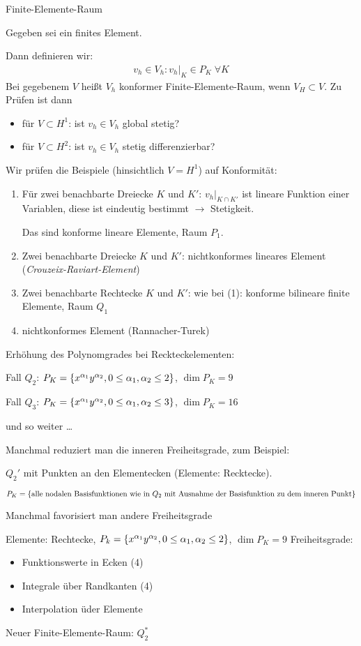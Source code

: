 \begin{definition} Finite-Elemente-Raum

Gegeben sei ein finites Element.

Dann definieren wir:
\begin{align*}
 v_h \in V_h: v_h|_K \in P_K \; \forall K
\end{align*}
Bei gegebenem $V$ heißt $V_h$ konformer Finite-Elemente-Raum, wenn $V_H \subset V$. Zu Prüfen ist dann
\begin{itemize}
\item für $V \subset H^1$: ist $v_h \in V_h$ global stetig?
\item für $V \subset H^2$: ist $v_h \in V_h$ stetig differenzierbar?
\end{itemize}
\end{definition}

Wir prüfen die Beispiele (hinsichtlich $V = H^1$) auf Konformität:
\begin{enumerate}
\item Für zwei benachbarte Dreiecke $K$ und $K'$: $v_h|_{K \cap K'}$ ist lineare Funktion einer Variablen, diese ist eindeutig bestimmt $\to$ Stetigkeit.

Das sind konforme lineare Elemente, Raum \emph{$P_1$}.
\item Zwei benachbarte Dreiecke $K$ und $K'$: nichtkonformes lineares Element (\emph{Crouzeix-Raviart-Element})
\item Zwei benachbarte Rechtecke $K$ und $K'$: wie bei (1): konforme bilineare finite Elemente, Raum \emph{$Q_1$}
\setcounter{enumi}{4}
\item nichtkonformes Element (Rannacher-Turek)
\end{enumerate}

Erhöhung des Polynomgrades bei Reckteckelementen:

Fall $Q_2$: $P_K = \left\{ x^{\alpha_1}y^{\alpha_2}, 0 \leq \alpha_1, \alpha_2 \leq 2 \right\}$, $\dim P_K = 9$

Fall $Q_3$: $P_K = \left\{ x^{\alpha_1}y^{\alpha_2}, 0 \leq \alpha_1, \alpha_2 \leq 3 \right\}$, $\dim P_K = 16$

und so weiter \dots

Manchmal reduziert man die inneren Freiheitsgrade, zum Beispiel:

\begin{beispiel}
  $Q_2'$ mit Punkten an den Elementecken (Elemente: Recktecke). 

$P_K = \left\{ \text{alle nodalen Basisfunktionen wie in }Q_2\text{ mit Ausnahme der Basisfunktion zu dem inneren Punkt} \right\}$
\end{beispiel}
Manchmal favorisiert man andere Freiheitsgrade
\begin{beispiel}
  Elemente: Rechtecke, $P_k = \left\{ x^{\alpha_1}y^{\alpha_2}, 0 \leq \alpha_1, \alpha_2 \leq 2 \right\}$, $\dim P_K = 9$
Freiheitsgrade:
\begin{itemize}
\item Funktionswerte in Ecken (4)
\item Integrale über Randkanten (4)
\item Interpolation üder Elemente
\end{itemize}
\end{beispiel}
Neuer Finite-Elemente-Raum: $Q_2^*$

